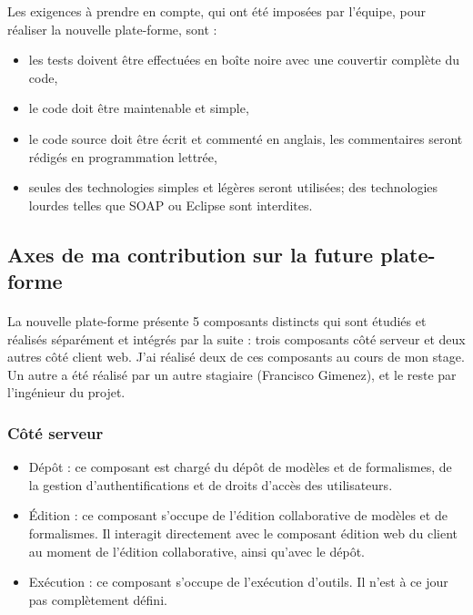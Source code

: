 \documentclass{report}
\begin{document}
Les exigences à prendre en compte, qui ont été imposées par l'équipe, pour
réaliser la nouvelle plate-forme, sont :

\begin{itemize}
\item les tests doivent être effectuées en boîte noire avec une couvertir complète du code,
\item le code doit être maintenable et simple,
\item le code source doit être écrit et commenté en anglais,
  les commentaires seront rédigés en programmation lettrée,
\item seules des technologies simples et légères seront utilisées;
  des technologies lourdes telles que SOAP ou Eclipse sont interdites.
\end{itemize}

\subsection{Axes de ma contribution sur la future plate-forme}

\paragraph{}
La nouvelle plate-forme présente 5 composants distincts qui sont étudiés et réalisés séparément et intégrés par la suite : trois composants côté serveur et deux autres côté client web.
J'ai réalisé deux de ces composants au cours de mon stage. Un autre a été
réalisé par un autre stagiaire (Francisco Gimenez), et le reste par
l'ingénieur du projet.

\subsubsection{Côté serveur}

\begin{itemize}
\item Dépôt : ce composant est chargé du dépôt de modèles et de formalismes, de la gestion d'authentifications 
et de droits d'accès des utilisateurs.
\item Édition : ce composant s'occupe de l'édition collaborative de modèles et de formalismes. Il interagit 
directement avec le composant édition web du client au moment de l'édition
collaborative,
ainsi qu'avec le dépôt.
\item Exécution : ce composant s'occupe de l'exécution d'outils. Il n'est à ce
  jour pas complètement défini.
\end{itemize}
\end{document}
